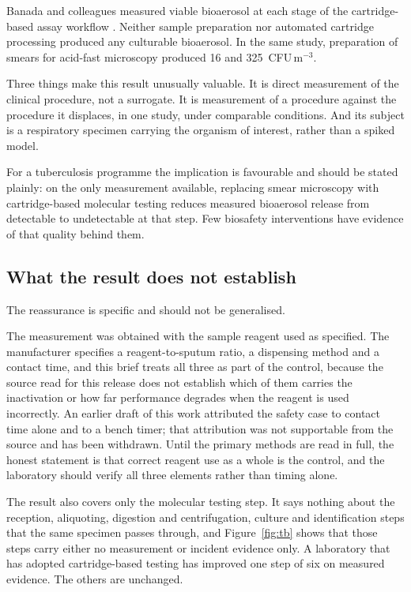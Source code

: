 Banada and colleagues measured viable bioaerosol at each stage of the
cartridge-based assay workflow \cite{banada2010}. Neither sample preparation
nor automated cartridge processing produced any culturable bioaerosol. In the
same study, preparation of smears for acid-fast microscopy produced 16 and
325~CFU\,m$^{-3}$.

Three things make this result unusually valuable. It is direct measurement of
the clinical procedure, not a surrogate. It is measurement of a procedure
against the procedure it displaces, in one study, under comparable conditions.
And its subject is a respiratory specimen carrying the organism of interest,
rather than a spiked model.

For a tuberculosis programme the implication is favourable and should be stated
plainly: on the only measurement available, replacing smear microscopy with
cartridge-based molecular testing reduces measured bioaerosol release from
detectable to undetectable at that step. Few biosafety interventions have
evidence of that quality behind them.

\subsection{What the result does not establish}

The reassurance is specific and should not be generalised.

The measurement was obtained with the sample reagent used as specified. The
manufacturer specifies a reagent-to-sputum ratio, a dispensing method and a
contact time, and this brief treats all three as part of the control, because
the source read for this release does not establish which of them carries the
inactivation or how far performance degrades when the reagent is used
incorrectly. An earlier draft of this work attributed the safety case to
contact time alone and to a bench timer; that attribution was not supportable
from the source and has been withdrawn. Until the primary methods are read in
full, the honest statement is that correct reagent use as a whole is the
control, and the laboratory should verify all three elements rather than
timing alone.

The result also covers only the molecular testing step. It says nothing about
the reception, aliquoting, digestion and centrifugation, culture and
identification steps that the same specimen passes through, and
Figure~\ref{fig:tb} shows that those steps carry either no measurement or
incident evidence only. A laboratory that has adopted cartridge-based testing
has improved one step of six on measured evidence. The others are unchanged.

